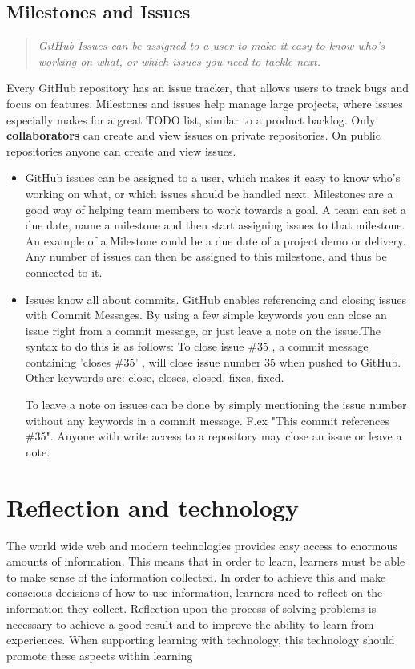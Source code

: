 \subsection{Milestones and Issues}
\begin{quote}
\em GitHub Issues can be assigned to a user to make it easy to know who's working on what, or which issues you need to tackle next.
\end{quote}
Every GitHub repository has an issue tracker, that allows users to track bugs and focus on features. Milestones and issues help manage large projects, where issues especially makes for a great TODO list, similar to a product backlog. Only {\bf collaborators} can create and view issues on private repositories. On public repositories anyone can create and view issues. 
\begin{itemize}
\item GitHub issues can be assigned to a user, which makes it easy to know who's working on what, or which issues should be handled next. Milestones are a good way of helping team members to work towards a goal. A team can set a due date, name a milestone and then start assigning issues to that milestone. An example of a Milestone could be a due date of a project demo or delivery. Any number of issues can then be assigned to this milestone, and thus be connected to it. 
\item Issues know all about commits. GitHub enables referencing and closing issues with Commit Messages. By using a few simple keywords you can close an issue right from a commit message, or just leave a note on the issue.The syntax to do this is as follows: To close issue \#35 , a commit message containing 'closes \#35' , will close issue number 35 when pushed to GitHub. Other keywords are: close, closes, closed, fixes, fixed. 

To leave a note on issues can be done by simply mentioning the issue number without any keywords in a commit message. F.ex "This commit references \#35". Anyone with write access to a repository may close an issue or leave a note.
\end{itemize}

\section{Reflection and technology}
The world wide web and modern technologies provides easy access to enormous amounts of information. This means that in order to learn, learners must be able to make sense of the information collected.  
In order to achieve this and make conscious decisions of how to use information, learners need to reflect on the information they collect. Reflection upon the process of solving problems is necessary to achieve a good result and to improve the ability to learn from experiences. When supporting learning with technology, this technology should promote these aspects within learning\cite{Lin1999}

